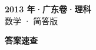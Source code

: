 \documentclass[zihao=-4, a4paper]{ctexart}
\begin{document}
\begin{center}
  {\Large\bfseries 2013 年·广东卷·理科}\\[4pt]
  {\large 数学 · 简答版}
\end{center}
\medskip
{}

\clearpage
{}
\begin{center}{\Large\bfseries 答案速查}\end{center}
\medskip

\end{document}
